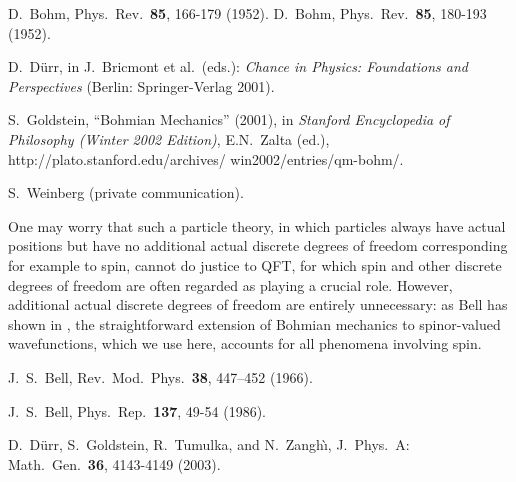 \documentclass[prl, twocolumn, showpacs, superscriptaddress]{revtex4}%
\begin{document}
\begin{thebibliography}{28.}


 D.~Bohm,
   Phys.\ Rev.\ \textbf{85}, 166-179 (1952).  D.~Bohm,
   Phys.\ Rev.\ \textbf{85}, 180-193 (1952).

 D.~D\"urr, %
   in J.~Bricmont et
   al.\ (eds.): \textit{Chance in Physics: Foundations and
   Perspectives}  (Berlin: Springer-Verlag 2001).

 S.~Goldstein, ``Bohmian Mechanics'' (2001), in
   \textit{Stanford Encyclopedia of Philosophy (Winter 2002 Edition)},
   E.N.~Zalta (ed.),
   http://plato.stanford.edu/archives/ win2002/entries/qm-bohm/.

 S.~Weinberg (private communication).

 One may worry that such a particle theory, in which
particles always have actual positions but have no additional actual
discrete degrees of freedom corresponding for example to spin, cannot
do justice to QFT, for which spin and other discrete degrees of
freedom are often regarded as playing a crucial role. However,
additional actual discrete degrees of freedom are entirely
unnecessary: as Bell has shown in \cite{1966}, the straightforward
extension of Bohmian mechanics to spinor-valued wavefunctions, which
we use here, accounts for all phenomena involving spin.

 J.~S.~Bell,
    Rev.\ Mod.\ Phys.\ \textbf{38}, 447--452 (1966).

 J.~S.~Bell,
   Phys.\ Rep.\ \textbf{137}, 49-54 (1986).

 D.~D\"urr, S.~Goldstein, R.~Tumulka, and N.~Zangh{\`\i},
   J.\ Phys.\ A: Math.\ Gen.\ \textbf{36},
   4143-4149 (2003). %


\end{thebibliography}
\end{document}
